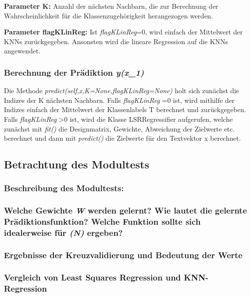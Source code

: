 \noindent
\textbf{Parameter K:} Anzahl der nächsten Nachbarn, die zur Berechnung der Wahrscheinlichkeit für die Klassenzugehörigkeit herangezogen werden.  

\noindent
\textbf{Parameter flagKLinReg:} Ist \textit{flagKLinReg}=0, wird einfach der Mittelwert der KNNs zurückgegeben.
Ansonsten wird die lineare Regression auf die KNNs angewendet. 

\subsubsection{ Berechnung der Prädiktion \textit{y(x_1)} }

\noindent
 \vspace{0px}
Die Methode \textit{predict(self,x,K=None,flagKLinReg=None)} holt sich zunächst die Indizes der K nächsten Nachbarn. 
Falls \textit{ flagKLinReg }=0 ist, wird mithilfe der Indizes einfach der Mittelwert der Klassenlabels T berechnet und zurückgegeben. 
Falls \textit{ flagKLinReg }>0 ist, wird die Klasse LSRRegressifier aufgerufen, welche zunächst mit \textit{ fit() } die Designmatrix, Gewichte, Abweichung der Zielwerte etc. berechnet und dann mit \textit{ predict() } die Zielwerte für den Textvektor x berechnet. 

\subsection{
    Betrachtung des Modultests
}

\subsubsection{ Beschreibung des Modultests: }

\subsubsection{ Welche Gewichte \textit{W} werden gelernt? Wie lautet die gelernte Prädiktionsfunktion? Welche Funktion sollte sich idealerweise für \textit{(N\rightarrow\infty)} ergeben? }

\subsubsection{ Ergebnisse der Kreuzvalidierung und Bedeutung der Werte }

\subsubsection{ Vergleich von Least Squares Regression und KNN-Regression }
